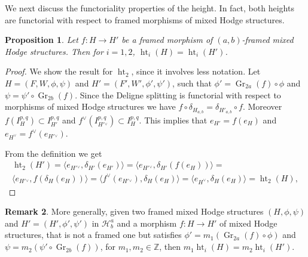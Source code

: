 \documentclass[11pt,a4paper]{amsart}
\newcommand{\Z}{\mathds{Z}}
\newcommand{\caH}{\mathcal{H}}
\DeclareMathOperator {\Gr} {Gr}
\DeclareMathOperator{\Ht}{ht}
\numberwithin{equation}{section}
\theoremstyle{plain}
\newtheorem{prop}{Proposition}[section]
\theoremstyle{definition}
\newtheorem{rmk}[prop]{Remark}
\begin{document}
We next discuss the functoriality properties of the height. In fact, 
both heights are functorial with respect to framed morphisms of mixed
Hodge structures. 
\begin{prop}\label{height-ind-morphism}
Let $f\colon H\rightarrow H'$ be a framed morphism of $(a,b)$-framed
mixed Hodge structures. Then for $i=1,2$,
$\Ht_{i}(H)=\Ht_{i}(H')$. 
\end{prop}
\begin{proof}
We show the result for $\Ht_{2}$, since it involves less notation. Let
$H=(F,W, \phi,\psi)$ and $H'=(F',W', \phi',
\psi')$, such that $\phi'=\Gr_{2a}(f)\circ \phi$ and
$\psi=\psi'\circ \Gr_{2b}(f)$. Since the Deligne splitting is functorial
with respect to morphisms of mixed Hodge structures we have $f\circ
\delta_{H_{a,b}}=\delta_{H'_{a,b}}\circ f$. Moreover $f(I^{p,q}_{H})\subset
I^{p,q}_{H'}$ and $f^{\vee}(I^{p,q}_{H'{}^{\vee}})\subset
I^{p,q}_{H}$. This implies that $e_{H'}=f(e_{H})$ and
$e_{H^{\vee}}=f^{\vee}(e_{H'{}^{\vee}})$. 

From the definition we get
\begin{multline*}
\Ht_{2}(H')=\langle  e_{H'{}^{\vee}},\delta _{H'}(e_{H'})\rangle
=
\langle  e_{H'{}^{\vee}},\delta _{H'}(f(e_{H}))\rangle =\\
\langle  e_{H'{}^{\vee}}, f(\delta _{H}(e_{H}))\rangle =
\langle  f^{\vee}(e_{H'{}^{\vee}}), \delta _{H}(e_{H})\rangle =
\langle  e_{H^{\vee}},\delta _{H}(e_{H})\rangle =
\Ht_{2}(H),
\end{multline*}
\end{proof}
\begin{rmk}\label{rem:correspondence}
  More generally, given two framed mixed Hodge
structures $(H, \phi,\psi)$ and $H'=(H',\phi', \psi')$ in
$\caH^{a}_{b}$ and a morphism $f\colon H\to H'$ of 
mixed Hodge structures, that is not a framed one but satisfies   
  $\phi'=m_{1}(\Gr_{2a}(f)\circ \phi)$ and $\psi=m_{2}(\psi'\circ
  \Gr_{2b}(f))$, for $m_{1},m_{2}\in \Z$, then
  $m_{1}\Ht_{i}(H)=m_{2}\Ht_{i}(H')$. 
\end{rmk}
\end{document}
